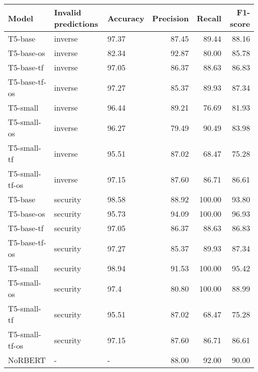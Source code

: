 \begin{tabular}{lllrrr}
\toprule
         Model & Invalid predictions & Accuracy &  Precision &  Recall &  F1-score \\
\midrule
       T5-base &             inverse &    97.37 &      87.45 &   89.44 &     88.16 \\
    T5-base-os &             inverse &    82.34 &      92.87 &   80.00 &     85.78 \\
    T5-base-tf &             inverse &    97.05 &      86.37 &   88.63 &     86.83 \\
 T5-base-tf-os &             inverse &    97.27 &      85.37 &   89.93 &     87.34 \\
      T5-small &             inverse &    96.44 &      89.21 &   76.69 &     81.93 \\
   T5-small-os &             inverse &    96.27 &      79.49 &   90.49 &     83.98 \\
   T5-small-tf &             inverse &    95.51 &      87.02 &   68.47 &     75.28 \\
T5-small-tf-os &             inverse &    97.15 &      87.60 &   86.71 &     86.61 \\
       T5-base &            security &    98.58 &      88.92 &  100.00 &     93.80 \\
    T5-base-os &            security &    95.73 &      94.09 &  100.00 &     96.93 \\
    T5-base-tf &            security &    97.05 &      86.37 &   88.63 &     86.83 \\
 T5-base-tf-os &            security &    97.27 &      85.37 &   89.93 &     87.34 \\
      T5-small &            security &    98.94 &      91.53 &  100.00 &     95.42 \\
   T5-small-os &            security &     97.4 &      80.80 &  100.00 &     88.99 \\
   T5-small-tf &            security &    95.51 &      87.02 &   68.47 &     75.28 \\
T5-small-tf-os &            security &    97.15 &      87.60 &   86.71 &     86.61 \\
       NoRBERT &                   - &        - &      88.00 &   92.00 &     90.00 \\
\bottomrule
\end{tabular}
